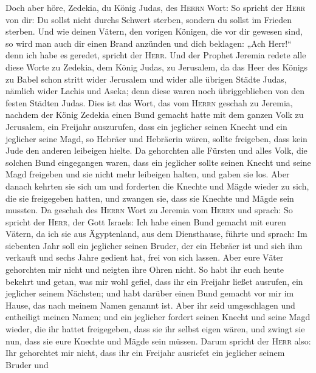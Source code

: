  Doch aber höre, Zedekia, du König Judas, des
\textsc{Herrn} Wort: So spricht der \textsc{Herr} von dir: Du sollst
nicht durchs Schwert sterben,  sondern du sollst im
Frieden sterben. Und wie deinen Vätern, den vorigen Königen, die vor dir
gewesen sind, so wird man auch dir einen Brand anzünden und dich
beklagen: „Ach Herr!{}`` denn ich habe es geredet, spricht der
\textsc{Herr}.  Und der Prophet Jeremia redete alle diese
Worte zu Zedekia, dem König Judas, zu Jerusalem,  da das
Heer des Königs zu Babel schon stritt wider Jerusalem und wider alle
übrigen Städte Judas, nämlich wider Lachis und Aseka; denn diese waren
noch übriggeblieben von den festen Städten Judas.  Dies
ist das Wort, das vom \textsc{Herrn} geschah zu Jeremia, nachdem der
König Zedekia einen Bund gemacht hatte mit dem ganzen Volk zu Jerusalem,
ein Freijahr auszurufen,  dass ein jeglicher seinen Knecht
und ein jeglicher seine Magd, so Hebräer und Hebräerin wären, sollte
freigeben, dass kein Jude den anderen leibeigen hielte. 
Da gehorchten alle Fürsten und alles Volk, die solchen Bund eingegangen
waren, dass ein jeglicher sollte seinen Knecht und seine Magd freigeben
und sie nicht mehr leibeigen halten, und gaben sie los. 
Aber danach kehrten sie sich um und forderten die Knechte und Mägde
wieder zu sich, die sie freigegeben hatten, und zwangen sie, dass sie
Knechte und Mägde sein mussten.  Da geschah des
\textsc{Herrn} Wort zu Jeremia vom \textsc{Herrn} und sprach:
 So spricht der \textsc{Herr}, der Gott Israels: Ich habe
einen Bund gemacht mit euren Vätern, da ich sie aus Ägyptenland, aus dem
Diensthause, führte und sprach:  Im siebenten Jahr soll
ein jeglicher seinen Bruder, der ein Hebräer ist und sich ihm verkauft
und sechs Jahre gedient hat, frei von sich lassen. Aber eure Väter
gehorchten mir nicht und neigten ihre Ohren nicht.  So
habt ihr euch heute bekehrt und getan, was mir wohl gefiel, dass ihr ein
Freijahr ließet ausrufen, ein jeglicher seinem Nächsten; und habt
darüber einen Bund gemacht vor mir im Hause, das nach meinem Namen
genannt ist.  Aber ihr seid umgeschlagen und entheiligt
meinen Namen; und ein jeglicher fordert seinen Knecht und seine Magd
wieder, die ihr hattet freigegeben, dass sie ihr selbst eigen wären, und
zwingt sie nun, dass sie eure Knechte und Mägde sein müssen.
 Darum spricht der \textsc{Herr} also: Ihr gehorchtet mir
nicht, dass ihr ein Freijahr ausriefet ein jeglicher seinem Bruder und
